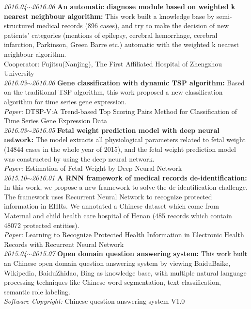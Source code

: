 \documentclass[line, margin]{res}
\newcommand{\xiaowu}{\fontsize{9pt}{15.75pt}\selectfont} %
\begin{document}
\begin{resume}
 {\sl 2016.04$\sim$2016.06} \textbf{An automatic diagnose module based on weighted k nearest neighbour algorithm: } This work built a knowledge base by semi-structured medical records (896 cases), and try to make the decision of new patients' categories (mentions of epilepsy, cerebral hemorrhage, cerebral infarction, Parkinson, Green Barre etc.) automatic with the weighted k nearest neighbour algorithm.   \\
 {\xiaowu Cooperator: Fujitsu(Nanjing), The First Affiliated Hospital of Zhengzhou University} \\
[7pt] 
 {\sl 2016.03$\sim$2016.06} \textbf{Gene classification with dynamic TSP algorithm: }
 {Based on the traditional TSP algorithm, this work proposed a new classification algorithm for time series gene expression.}\\
 {\sl\xiaowu Paper:} {\xiaowu DTSP-V:A Trend-based Top Scoring Pairs Method for Classification of Time Series Gene Expression Data}\\
[7pt] 
 {\sl 2016.03$\sim$2016.05} \textbf{Fetal weight prediction model with deep neural network:}
 {The model extracts all physiological parameters related to fetal weight (14844 cases in the whole year of 2015), and the fetal weight prediction model was constructed by using the deep neural network.}\\
 {\sl\xiaowu Paper:} {\xiaowu Estimation of Fetal Weight by Deep Neural Network} \\
[7pt]
 {\sl 2015.10$\sim$2016.01} \textbf{A RNN framework of medical records de-identification: }
 {In this work, we propose a new framework to solve the de-identification challenge. The framework uses Recurrent Neural Network to recognize protected information in EHRs. We annotated a Chinese dataset which come from Maternal and child health care hospital of Henan (485 records which contain 48072 protected entities).} \\
 {\sl\xiaowu Paper:} {\xiaowu Learning to Recognize Protected Health Information in  Electronic Health Records with Recurrent Neural Network}\\
[7pt] 
 {\sl 2015.04$\sim$2015.07} \textbf{Open domain question answering system: }
 {This work built an Chinese open domain question answering system by viewing BaiduBaike, Wikipedia, BaiduZhidao, Bing as knowledge base, with multiple natural language processing techniques like Chinese word segmentation, text classification, semantic role labeling. }\\ 
 {\sl\xiaowu Software Copyright:} {\xiaowu Chinese question answering system V1.0} \\

\end{resume}
\end{document}
